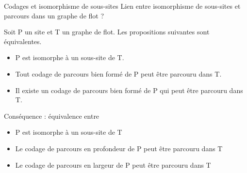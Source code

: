 \documentclass{beamer}
\begin{document}
\begin{frame}{Codages et isomorphisme de sous-sites}
Lien entre isomorphisme de sous-sites et parcours dans un graphe de flot ?

\pause
\begin{theo}
 Soit P un site et T un graphe de flot. Les propositions suivantes sont équivalentes.
 \begin{itemize}
  \item P est isomorphe à un sous-site de T.
  \item Tout codage de parcours bien formé de P peut être parcouru dans T.
  \item Il existe un codage de parcours bien formé de P qui peut être parcouru dans T.
 \end{itemize}
\end{theo}

\pause
Conséquence : équivalence entre
\begin{itemize}
 \item P est isomorphe à un sous-site de T
 \item Le codage de parcours en profondeur de P peut être parcouru dans T
 \item Le codage de parcours en largeur de P peut être parcouru dans T
\end{itemize}

\end{frame}
\end{document}
